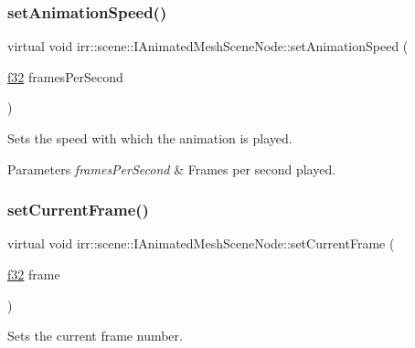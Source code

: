 \subsubsection{\texorpdfstring{set\+Animation\+Speed()}{setAnimationSpeed()}}
{\footnotesize\ttfamily virtual void irr\+::scene\+::\+I\+Animated\+Mesh\+Scene\+Node\+::set\+Animation\+Speed (\begin{DoxyParamCaption}\item[{\hyperlink{namespaceirr_a0277be98d67dc26ff93b1a6a1d086b07}{f32}}]{frames\+Per\+Second }\end{DoxyParamCaption})\hspace{0.3cm}{\ttfamily [pure virtual]}}



Sets the speed with which the animation is played. 


\begin{DoxyParams}{Parameters}
{\em frames\+Per\+Second} & Frames per second played. \\
\hline
\end{DoxyParams}
\mbox{\label{classirr_1_1scene_1_1IAnimatedMeshSceneNode_aff1c1e2270f4d3d94e58e7c130c575a4}} 
\subsubsection{\texorpdfstring{set\+Current\+Frame()}{setCurrentFrame()}}
{\footnotesize\ttfamily virtual void irr\+::scene\+::\+I\+Animated\+Mesh\+Scene\+Node\+::set\+Current\+Frame (\begin{DoxyParamCaption}\item[{\hyperlink{namespaceirr_a0277be98d67dc26ff93b1a6a1d086b07}{f32}}]{frame }\end{DoxyParamCaption})\hspace{0.3cm}{\ttfamily [pure virtual]}}



Sets the current frame number. 

